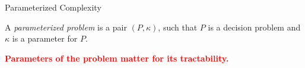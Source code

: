 \documentclass[10pt,aspectratio=169,english]{beamer}
\begin{document}
\begin{frame}{Parameterized Complexity}
	
	\begin{definition}
		A \textit{parameterized problem} is a pair $(P, \kappa)$, such that $P$ is a decision problem and $\kappa$ is a parameter for $P$.
	\end{definition}
	
	
	\textcolor{red}{\textbf{Parameters of the problem matter for its tractability.}}
\end{frame}

\end{document}
